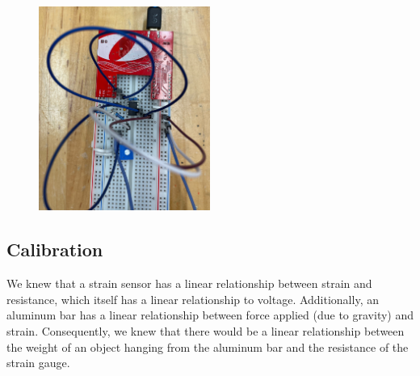 \documentclass[11pt]{article}
\begin{document}
\begin{figure} [!ht]

	\centering  %
	
	\includegraphics[width=0.5\textwidth]{breadboard.jpg}
	
	
	\caption{}
	
	\label{fig:breadboard}
\end{figure}


\subsection{Calibration}

We knew that a strain sensor has a linear relationship between strain and resistance, which itself has a linear relationship to voltage. Additionally, an aluminum bar has a linear relationship between force applied (due to gravity) and strain. Consequently, we knew that there would be a linear relationship between the weight of an object hanging from the aluminum bar and the resistance of the strain gauge.
\end{document}
